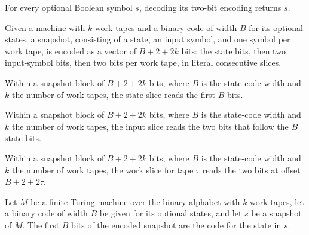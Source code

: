 \begin{lemma}
\label{Complexity.clSymbolDecode_code}
\leanok
{}
For every optional Boolean symbol $s$, decoding its two-bit encoding returns $s$.
\end{lemma}

\begin{definition}
\label{Complexity.clBlockEncode}
\leanok
{}
Given a machine with $k$ work tapes and a binary code of width $B$ for its optional states, a snapshot, consisting of a state, an input symbol, and one symbol per work tape, is encoded as a vector of $B + 2 + 2k$ bits: the state bits, then two input-symbol bits, then two bits per work tape, in literal consecutive slices.
\end{definition}

\begin{definition}
\label{Complexity.clStateSlice}
\leanok
{}
Within a snapshot block of $B + 2 + 2k$ bits, where $B$ is the state-code width and $k$ the number of work tapes, the state slice reads the first $B$ bits.
\end{definition}

\begin{definition}
\label{Complexity.clInputSlice}
\leanok
{}
Within a snapshot block of $B + 2 + 2k$ bits, where $B$ is the state-code width and $k$ the number of work tapes, the input slice reads the two bits that follow the $B$ state bits.
\end{definition}

\begin{definition}
\label{Complexity.clWorkSlice}
\leanok
{}
Within a snapshot block of $B + 2 + 2k$ bits, where $B$ is the state-code width and $k$ the number of work tapes, the work slice for tape $\tau$ reads the two bits at offset $B + 2 + 2\tau$.
\end{definition}

\begin{lemma}
\label{Complexity.clBlock_state}
\leanok
{}
Let $M$ be a finite Turing machine over the binary alphabet with $k$ work tapes, let a
binary code of width $B$ be given for its optional states, and let $s$ be a snapshot of
$M$. The first $B$ bits of the encoded snapshot are the code for the state in $s$.
\end{lemma}

